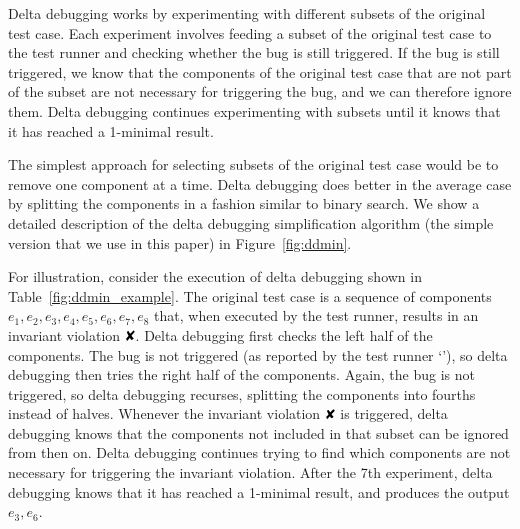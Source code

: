 Delta debugging works by experimenting with different subsets of the original test
case. Each experiment involves feeding a subset of the original test case to the test runner
and checking whether the bug is still triggered. If the bug is still
triggered, we know that the components of the original test case that are not part of the
subset are not necessary for triggering the
bug, and we can therefore ignore them. Delta debugging continues experimenting
with subsets until it knows that it has reached a 1-minimal result.

The simplest approach for selecting subsets of the original test case would be
to remove one component at a time. Delta debugging does better in the average
case by splitting the components in a fashion similar to binary search. We
show a detailed description of the delta debugging simplification algorithm
(the simple version that we use in this paper) in Figure~\ref{fig:ddmin}.

For illustration, consider the
execution of delta debugging shown in Table~\ref{fig:ddmin_example}. The original
test case is a sequence of components $e_1,e_2,e_3,e_4,e_5,e_6,e_7,e_8$ that,
when executed by the test runner, results in an invariant violation $\DFAIL$. Delta
debugging first checks the left half of the components. The bug is not
triggered (as reported by the test runner `'),
so delta debugging then tries the right half of the components. Again, the
bug is not triggered, so delta debugging recurses, splitting the components
into fourths instead of halves. Whenever the invariant violation $\DFAIL$ is
triggered, delta debugging knows that the components not included in that
subset can be
ignored from then on. Delta debugging continues trying to find which
components are not necessary for triggering the invariant violation. After the 7th experiment, delta debugging
knows that it has reached a 1-minimal result, and produces the output
$e_3,e_6$.

